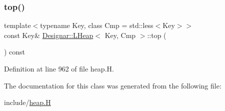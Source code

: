 \subsubsection{\texorpdfstring{top()}{top()}}
{\footnotesize\ttfamily template$<$typename Key, class Cmp = std\+::less$<$\+Key$>$$>$ \\
const Key\& \hyperlink{class_designar_1_1_l_heap}{Designar\+::\+L\+Heap}$<$ Key, Cmp $>$\+::top (\begin{DoxyParamCaption}{ }\end{DoxyParamCaption}) const\hspace{0.3cm}{\ttfamily [inline]}}



Definition at line 962 of file heap.\+H.



The documentation for this class was generated from the following file\+:\begin{DoxyCompactItemize}
\item 
include/\hyperlink{heap_8_h}{heap.\+H}\end{DoxyCompactItemize}
